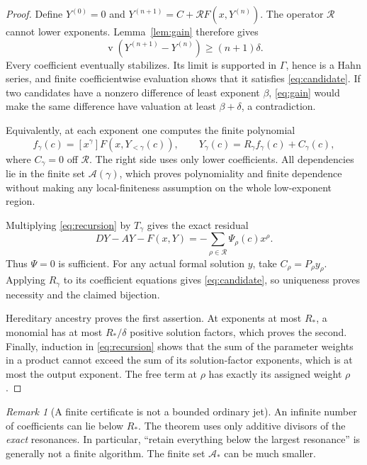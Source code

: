 \documentclass[11pt,a4paper]{article}
\numberwithin{equation}{section}
\theoremstyle{definition}
\theoremstyle{remark}
\newtheorem{remark}[theorem]{Remark}
\newcommand{\G}{\Gamma}
\newcommand{\Res}{\mathcal R}
\newcommand{\Anc}{\mathcal A}
\newcommand{\val}{\operatorname{v}}
\begin{document}
\begin{proof}
Define $Y^{(0)}=0$ and
$Y^{(n+1)}=C+\mathscr R F(x,Y^{(n)})$.
The operator $\mathscr R$ cannot lower exponents. Lemma~\ref{lem:gain}
therefore gives
\[
 \val(Y^{(n+1)}-Y^{(n)})\geq(n+1)\delta.
\]
Every coefficient eventually stabilizes. Its limit is supported in $\G$,
hence is a Hahn series, and finite coefficientwise evaluation shows that
it satisfies \eqref{eq:candidate}. If two candidates have a nonzero
difference of least exponent $\beta$, \eqref{eq:gain} would make the same
difference have valuation at least $\beta+\delta$, a contradiction.

Equivalently, at each exponent one computes the finite polynomial
\begin{equation}\label{eq:recursion}
 f_\gamma(c)=[x^\gamma]F(x,Y_{<\gamma}(c)),\qquad
 Y_\gamma(c)=R_\gamma f_\gamma(c)+C_\gamma(c),
\end{equation}
where $C_\gamma=0$ off $\Res$. The right side uses only lower
coefficients. All dependencies lie in the finite set $\Anc(\gamma)$,
which proves polynomiality and finite dependence without making any
local-finiteness assumption on the whole low-exponent region.

Multiplying \eqref{eq:recursion} by $T_\gamma$ gives the exact residual
\begin{equation}\label{eq:residual}
 DY-AY-F(x,Y)=-\sum_{\rho\in\Res}\Psi_\rho(c)x^\rho.
\end{equation}
Thus $\Psi=0$ is sufficient. For any actual formal solution $y$, take
$C_\rho=P_\rho y_\rho$. Applying $R_\gamma$ to its coefficient equations
gives \eqref{eq:candidate}, so uniqueness proves necessity and the claimed
bijection.

Hereditary ancestry proves the first assertion. At exponents at most
$R_*$, a monomial has at most $R_*/\delta$ positive solution factors,
which proves the second. Finally, induction in \eqref{eq:recursion} shows
that the sum of the parameter weights in a product cannot exceed the sum
of its solution-factor exponents, which is at most the output exponent.
The free term at $\rho$ has exactly its assigned weight $\rho$.
\end{proof}

\begin{remark}[A finite certificate is not a bounded ordinary jet]
An infinite number of coefficients can lie below $R_*$. The theorem uses
only additive divisors of the \emph{exact} resonances. In particular,
``retain everything below the largest resonance'' is generally not a finite
algorithm. The finite set $\Anc_*$ can be much smaller.
\end{remark}
\end{document}
